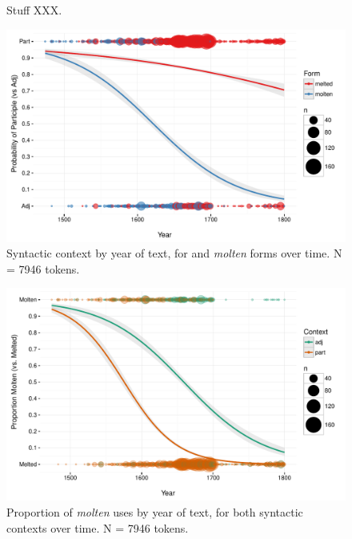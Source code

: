 \documentclass{artikel3}
\begin{document}
%

%
  

\pagebreak 

\begin{figure}
    \begin{center}
    \caption{Stuff XXX.}
       \label{whether}
    \end{center}
\end{figure}

\begin{figure}
    \begin{center}
    \includegraphics[scale=.6]{ContextByDateUnbinnedWithDots2.pdf}
    \caption{Syntactic context by year of text, for  and \textsl{molten} forms over time. N =  7946 tokens.}
       \label{molten1}
    \end{center}
\end{figure}

\begin{figure}
    \begin{center}
    \includegraphics[scale=.6]{FormByDateUnbinnedWithDots2.pdf}
    \caption{Proportion of \textsl{molten} uses by year of text, for both syntactic contexts over time. N =  7946 tokens.}
       \label{molten2}
    \end{center}
\end{figure}
\end{document}
